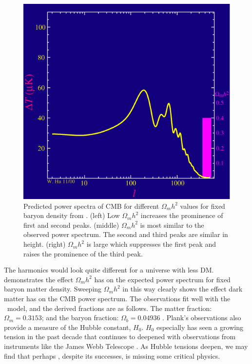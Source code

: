 \begin{figure}[ht]
{        \includegraphics[scale=0.285]{figures/LCDM_multipole/frame_16_delay-0.2s.png}
        \caption{Predicted power spectra of CMB for different $\Omega_m h^2$ values for fixed baryon density from \cite{waynehu:dm_anim}. (left) Low $\Omega_m h^2$ increases the prominence of first and second peaks. (middle) $\Omega_m h^2$ is most similar to the observed power spectrum. The second and third peaks are similar in height. (right) $\Omega_mh^2$ is large which suppresses the first peak and raises the prominence of the third peak.}
        \label{fig:CMB_vibratemodes}
    }
\end{figure}

The harmonics would look quite different for a universe with less DM.
 demonstrates the effect $\Omega_m h^2$ has on the expected power spectrum for fixed baryon matter density. \cite{waynehu:dm_anim}
Sweeping  $\Omega_m h^2$ in this way clearly shows the effect dark matter has on the CMB power spectrum.
The observations fit well with the \lcdm~model, and the derived fractions are as follows.
The matter fraction: $\Omega_m = 0.3153$; and the baryon fraction: $\Omega_b = 0.04936$ \cite{Plank:CMB}.
Plank's observations also provide a measure of the Hubble constant, $H_0$.
$H_0$ especially has seen a growing tension in the past decade that continues to deepened with observations from instruments like the James Webb Telescope \cite{JWST:hubble_tension,Freedman:hubble_tension}.
As Hubble tensions deepen, we may find that perhaps \lcdm, despite its successes, is missing some critical physics.

